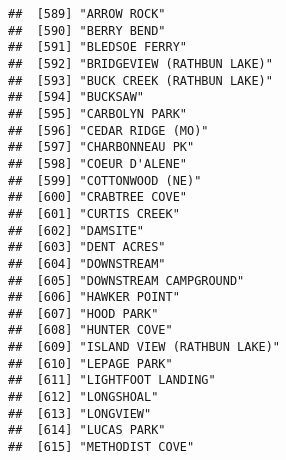 \documentclass[
]{article}
\begin{document}
\begin{verbatim}
##  [589] "ARROW ROCK"                                                                          
##  [590] "BERRY BEND"                                                                          
##  [591] "BLEDSOE FERRY"                                                                       
##  [592] "BRIDGEVIEW (RATHBUN LAKE)"                                                           
##  [593] "BUCK CREEK (RATHBUN LAKE)"                                                           
##  [594] "BUCKSAW"                                                                             
##  [595] "CARBOLYN PARK"                                                                       
##  [596] "CEDAR RIDGE (MO)"                                                                    
##  [597] "CHARBONNEAU PK"                                                                      
##  [598] "COEUR D'ALENE"                                                                       
##  [599] "COTTONWOOD (NE)"                                                                     
##  [600] "CRABTREE COVE"                                                                       
##  [601] "CURTIS CREEK"                                                                        
##  [602] "DAMSITE"                                                                             
##  [603] "DENT ACRES"                                                                          
##  [604] "DOWNSTREAM"                                                                          
##  [605] "DOWNSTREAM CAMPGROUND"                                                               
##  [606] "HAWKER POINT"                                                                        
##  [607] "HOOD PARK"                                                                           
##  [608] "HUNTER COVE"                                                                         
##  [609] "ISLAND VIEW (RATHBUN LAKE)"                                                          
##  [610] "LEPAGE PARK"                                                                         
##  [611] "LIGHTFOOT LANDING"                                                                   
##  [612] "LONGSHOAL"                                                                           
##  [613] "LONGVIEW"                                                                            
##  [614] "LUCAS PARK"                                                                          
##  [615] "METHODIST COVE"                                                                      

\end{verbatim}
\end{document}
